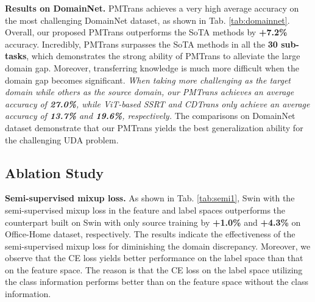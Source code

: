 \documentclass[10pt,twocolumn,letterpaper, ]{article}
\begin{document}
\vspace{-2pt}
\begin{table*}[t!]
\centering
{}
\vspace{-8pt}
\caption{Effect of PatchMix. The best performance is marked as \textbf{bold}.}
\vspace{-13pt}
\label{tab:Patch_Mixup}
\end{table*}
\noindent\textbf{Results on DomainNet.} PMTrans achieves a very high average accuracy on the most challenging DomainNet dataset, as shown in Tab. \ref{tab:domainnet}. Overall, our proposed PMTrans outperforms the SoTA methods by \textbf{+7.2\%} accuracy. Incredibly, PMTrans surpasses the SoTA methods in all the \textbf{30 sub-tasks}, which demonstrates the strong ability of PMTrans to alleviate the large domain gap. Moreover, transferring knowledge is much more difficult when the domain gap becomes significant. 
\textit{When taking more challenging  as the target domain while others as the source domain, our PMTrans achieves an average accuracy of \textbf{27.0\%}, while ViT-based SSRT and CDTrans only achieve an average accuracy of \textbf{13.7\%} and \textbf{19.6\%}, respectively.} The comparisons on DomainNet dataset demonstrate that our PMTrans yields the best generalization ability for the challenging UDA problem.
\subsection{Ablation Study}



\noindent\textbf{Semi-supervised mixup loss.}
As shown in Tab. \ref{tab:semi1}, Swin with the semi-supervised mixup loss in the feature and label spaces outperforms the counterpart built on Swin with only source training by \textbf{+1.0\%} and \textbf{+4.3\%} on Office-Home dataset, respectively. The results indicate the effectiveness of the semi-supervised mixup loss for diminishing the domain discrepancy. Moreover, we observe that the CE loss yields better performance on the label space than that on the feature space. The reason is that the CE loss on the label space utilizing the class information performs better than on the feature space without the class information.
\end{document}
